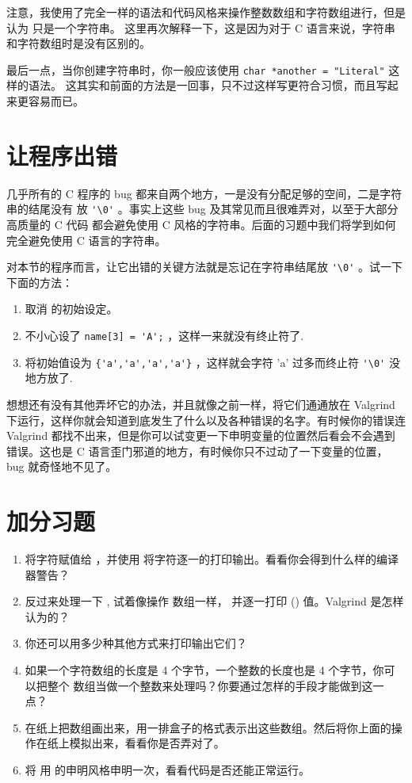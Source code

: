 注意，我使用了完全一样的语法和代码风格来操作整数数组和字符数组进行，但是  认为  只是一个字符串。 这里再次解释一下，这是因为对于 C 语言来说，字符串和字符数组时是没有区别的。  

最后一点，当你创建字符串时，你一般应该使用 \verb|char *another = "Literal"| 这样的语法。 这其实和前面的方法是一回事，只不过这样写更符合习惯，而且写起来更容易而已。


\section{让程序出错}

几乎所有的 C 程序的 bug 都来自两个地方，一是没有分配足够的空间，二是字符串的结尾没有
放 \verb|'\0'| 。事实上这些 bug 及其常见而且很难弄对，以至于大部分高质量的 C 代码
都会避免使用 C 风格的字符串。后面的习题中我们将学到如何完全避免使用 C 语言的字符串。

对本节的程序而言，让它出错的关键方法就是忘记在字符串结尾放 \verb|'\0'| 。试一下下面的方法：

\begin{enumerate}
\item 取消  的初始设定。
\item 不小心设了 \verb|name[3] = 'A';| ，这样一来就没有终止符了.
\item 将初始值设为 \verb|{'a','a','a','a'}| ，这样就会字符 'a' 过多而终止符 \verb|'\0'| 没地方放了.
\end{enumerate}

想想还有没有其他弄坏它的办法，并且就像之前一样，将它们通通放在 Valgrind 下运行，这样你就会知道到底发生了什么以及各种错误的名字。有时候你的错误连 Valgrind 都找不出来，但是你可以试变更一下申明变量的位置然后看会不会遇到错误。这也是 C 语言歪门邪道的地方，有时候你只不过动了一下变量的位置， bug 就奇怪地不见了。

\section{加分习题}

\begin{enumerate}
\item 将字符赋值给  ，并使用  将字符逐一的打印输出。看看你会得到什么样的编译器警告？
\item 反过来处理一下 , 试着像操作  数组一样， 并逐一打印 () 值。Valgrind 是怎样认为的？
\item 你还可以用多少种其他方式来打印输出它们？
\item 如果一个字符数组的长度是 4 个字节，一个整数的长度也是 4 个字节，你可以把整个  数组当做一个整数来处理吗？你要通过怎样的手段才能做到这一点？
\item 在纸上把数组画出来，用一排盒子的格式表示出这些数组。然后将你上面的操作在纸上模拟出来，看看你是否弄对了。
\item 将  用  的申明风格申明一次，看看代码是否还能正常运行。
\end{enumerate}


